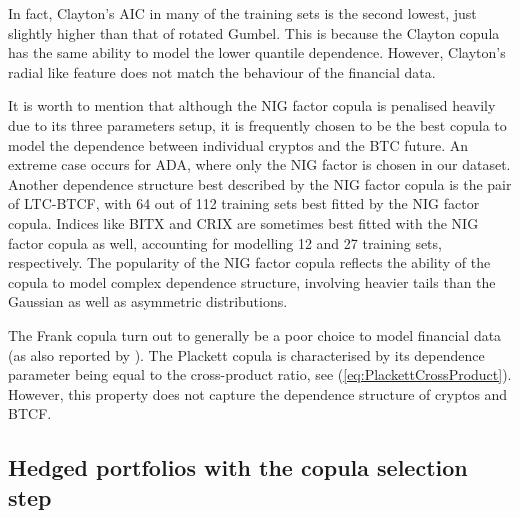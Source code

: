 In fact, Clayton's AIC in many of the training sets is the second
lowest, just slightly higher than that of rotated Gumbel. This is because the
Clayton copula has the same ability to model the lower quantile
dependence. However, Clayton's radial like feature does not match the
behaviour of the financial data. 

It is worth to mention that although the NIG factor copula is
penalised heavily due to its three parameters setup, it is frequently
chosen to be the best copula to model the dependence between
individual cryptos and the BTC future. An extreme case occurs for ADA,
where only the NIG factor is chosen in our dataset. 
Another dependence structure best described by the NIG factor
copula is the pair of LTC-BTCF, with 64 out of 112 training sets best
fitted by the NIG factor copula. Indices like BITX and CRIX are
sometimes best fitted with the NIG factor copula as well, accounting
for modelling 12 and 27 training sets, respectively. 
The popularity of the NIG factor copula reflects the ability of the
copula to model complex dependence structure, involving heavier tails
than the Gaussian as well as asymmetric distributions.


The Frank copula turn out to generally be a poor choice to model financial
data (as also reported by \cite{barbi2014copula}).
The Plackett copula is characterised by its dependence parameter being
equal to the cross-product ratio, see
(\ref{eq:PlackettCrossProduct}). However, this property
does not capture the dependence structure of cryptos and BTCF.

\subsection{Hedged portfolios with the copula selection step}\label{subsec:HP2}

\afterpage{
  \begin{landscape}
  
\end{landscape}
}

